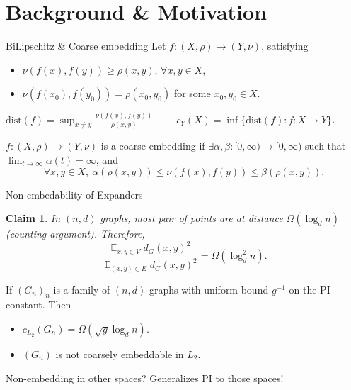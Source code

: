 \documentclass[compress]{beamer}
\DeclareMathOperator*{\Avg}{\mathbb{E}}
\newcommand{\dist}{\mathrm{dist}}
\newtheorem{claim}{Claim}
\begin{document}
\section{Background \& Motivation}

\begin{frame}{BiLipschitz \& Coarse embedding}
\onslide<+->
Let $f:(X,\rho)\to (Y,\nu)$, satisfying
\begin{itemize}
\item  $\nu(f(x),f(y)) \ge \rho(x,y)$, $\forall x,y\in X$,
\item $\nu(f(x_0),f(y_0))=\rho(x_0,y_0)$ for some $x_0,y_0\in X$.
\end{itemize}

\begin{definition}[Distortion]
$\dist(f)= \sup_{x\ne y} \frac {\nu(f(x),f(y))}{\rho(x,y)} \qquad$
$ c_Y(X)= \inf \{\dist(f): f:X\to Y\}$.
\end{definition}

\medskip

\onslide<+->
\begin{definition}
$f:(X,\rho) \to (Y,\nu)$ is a coarse embedding if $\exists \alpha,\beta:[0,\infty) \to [0,\infty)$ such that
$\lim _{t\to \infty} \alpha(t)=\infty$, and
\[ \forall x,y\in X,\  \alpha(\rho(x,y)) \le \nu(f(x),f(y)) \le \beta(\rho(x,y)). \]
\end{definition}

\end{frame}

\begin{frame}{Non embedability of Expanders}
\onslide<+->
\begin{claim}
In $(n,d)$ graphs,  most pair of points are at distance $\Omega(\log_d n)$ (counting argument).
Therefore,
\[ \frac{\Avg_{x,y\in V} d_G(x,y)^2 }{\Avg_{(x,y)\in E} d_G(x,y)^2} = \Omega(\log_d ^2 n) .\]
\end{claim}

\onslide<+->
\begin{theorem}
If $(G_n)_n$ is a  family of $(n,d)$ graphs  with uniform bound $g^{-1}$ on the PI constant. Then
\begin{itemize}
\item $c_{L_2}(G_n)=\Omega( \sqrt g \log_d n)$.
\item $(G_n)$ is not coarsely embeddable in $L_2$.
\end{itemize}
\end{theorem}

\onslide<+->
Non-embedding in other spaces?
\onslide <+-> Generalizes PI to those spaces!
\end{frame}
\end{document}
